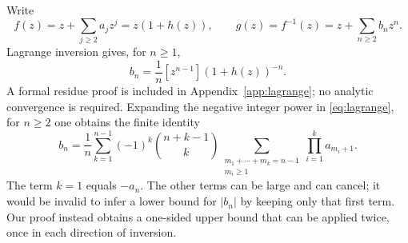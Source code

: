 \documentclass[11pt,a4paper]{article}
\numberwithin{equation}{section}
\theoremstyle{definition}
\theoremstyle{remark}
\begin{document}
Write
\begin{equation}
 f(z)=z+\sum_{j\ge2}a_jz^j=z(1+h(z)),\qquad
 g(z)=f^{-1}(z)=z+\sum_{n\ge2}b_nz^n.
 \label{eq:fg}
\end{equation}
Lagrange inversion gives, for $n\ge1$,
\begin{equation}
 b_n=\frac1n[z^{n-1}](1+h(z))^{-n}.
 \label{eq:lagrange}
\end{equation}
A formal residue proof is included in Appendix~\ref{app:lagrange}; no
analytic convergence is required. Expanding the negative integer power
in \eqref{eq:lagrange}, for $n\ge2$ one obtains the finite identity
\begin{equation}
 b_n=\frac1n\sum_{k=1}^{n-1}(-1)^k\binom{n+k-1}{k}
 \sum_{\substack{m_1+\cdots+m_k=n-1\\m_i\ge1}}
       \prod_{i=1}^k a_{m_i+1}.
 \label{eq:inversefinite}
\end{equation}
The term $k=1$ equals $-a_n$. The other terms can be large and can cancel;
it would be invalid to infer a lower bound for $|b_n|$ by keeping only
that first term. Our proof instead obtains a one-sided upper bound that
can be applied twice, once in each direction of inversion.
\end{document}
